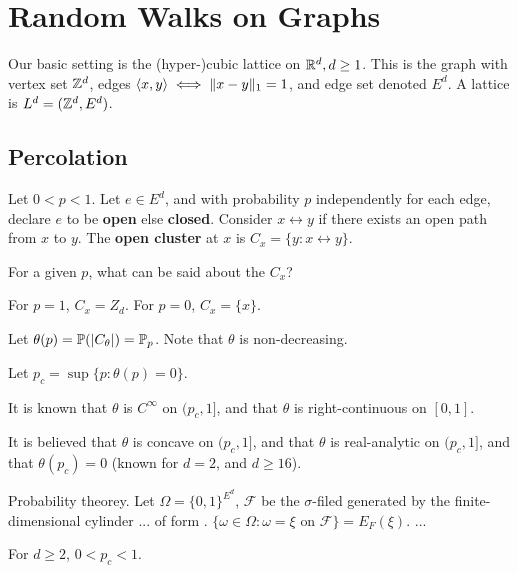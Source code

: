 
\chapter{Random Walks on Graphs}
\label{cha:random-walks-graphs}

Our basic setting is the (hyper-)cubic lattice on $\mathbb{R}^{d}, d \geq 1$.
This is the graph with vertex set $\mathbb{Z}^{d}$, edges $\IP{x, y} \iff \| x
- y \|_{1} = 1$, and edge set denoted $E^{d}$.  A lattice is $L^{d} =
(\mathbb{Z}^{d}, E^{d})$.

\section{Percolation}
\label{sec:percolation}

Let $0 < p < 1$. Let $e \in E^{d}$, and with probability $p$
independently for each edge, declare $e$ to be \textbf{open} else
\textbf{closed}. Consider $x \leftrightarrow y$ if there exists an
open path from $x$ to $y$. The \textbf{open cluster} at $x$ is $C_{x}
= \{ y: x \leftrightarrow y \}$.

\begin{boxthm}
  For a given $p$, what can be said about the $C_{x}$?
\end{boxthm}

For $p = 1$, $C_{x} = Z_{d}$.  For $p = 0$, $C_{x} = \{ x \}$.

\begin{defn}
  \label{defn:random_walks_on_graphs:1}
  Let $\theta(p) = \Prob{|C_{\theta}|} = \Prob_{p}$. Note that
  $\theta$ is non-decreasing.

  Let $p_{c} = \sup \{ p : \theta(p) = 0 \}$.

  It is known that $\theta$ is $C^{\infty}$ on $(p_{c}, 1]$, and that
  $\theta$ is right-continuous on $[0, 1]$.

  It is believed that $\theta$ is concave on $(p_{c}, 1]$, and that
  $\theta$ is real-analytic on $(p_{c}, 1]$, and that $\theta(p_{c}) =
  0$ (known for $d = 2$, and $d \geq 16$).
\end{defn}

\begin{defn}
  \label{defn:random_walks_on_graphs:2}
  Probability theorey.  Let $\Omega = \{ 0, 1\}^{E^{d}}$,
  $\mathcal{F}$ be the $\sigma$-filed generated by the
  finite-dimensional cylinder ... of form .
  $\{ \omega \in \Omega: \omega = \text{$\xi$ on $\mathcal{F}$}\} =
  E_{F}(\xi)$.
  ...
\end{defn}

\begin{thm}
  \label{defn:random_walks_on_graphs:3}
  For $d \geq 2$, $0 < p_{c} < 1$.
\end{thm}

